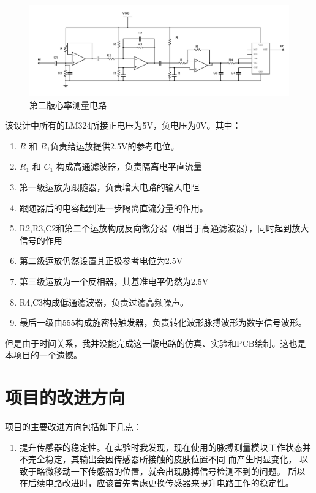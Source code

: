 \documentclass{article}
\begin{document}
\begin{spacing}{1.5}
\begin{enumerate}
        \begin{figure}[H]
            \centering
            \includegraphics[scale=0.3]{fig/design/design2.png}
            \caption{第二版心率测量电路}
            \label{fig:design2}
        \end{figure}
        
        该设计中所有的LM324所接正电压为5V，负电压为0V。其中：
        \begin{enumerate}
            \item $R$ 和 $R_1$负责给运放提供2.5V的参考电位。
            \item $R_1$ 和 $C_1$ 构成高通滤波器，负责隔离电平直流量
            \item 第一级运放为跟随器，负责增大电路的输入电阻
            \item 跟随器后的电容起到进一步隔离直流分量的作用。
            \item R2,R3,C2和第二个运放构成反向微分器（相当于高通滤波器），同时起到放大信号的作用
            \item 第二级运放仍然设置其正极参考电位为2.5V
            \item 第三级运放为一个反相器，其基准电平仍然为2.5V
            \item R4,C3构成低通滤波器，负责过滤高频噪声。
            \item 最后一级由555构成施密特触发器，负责转化波形脉搏波形为数字信号波形。
        \end{enumerate}

        但是由于时间关系，我并没能完成这一版电路的仿真、实验和PCB绘制。这也是本项目的一个遗憾。

    \end{enumerate}

\section{项目的改进方向}

    项目的主要改进方向包括如下几点：

    \begin{enumerate}
        \item 提升传感器的稳定性。在实验时我发现，现在使用的脉搏测量模块工作状态并不完全稳定，其输出会因传感器所接触的皮肤位置不同
        而产生明显变化，
        以致于略微移动一下传感器的位置，就会出现脉搏信号检测不到的问题。
        所以在后续电路改进时，应该首先考虑更换传感器来提升电路工作的稳定性。


\end{enumerate}
\end{spacing}
\end{document}
